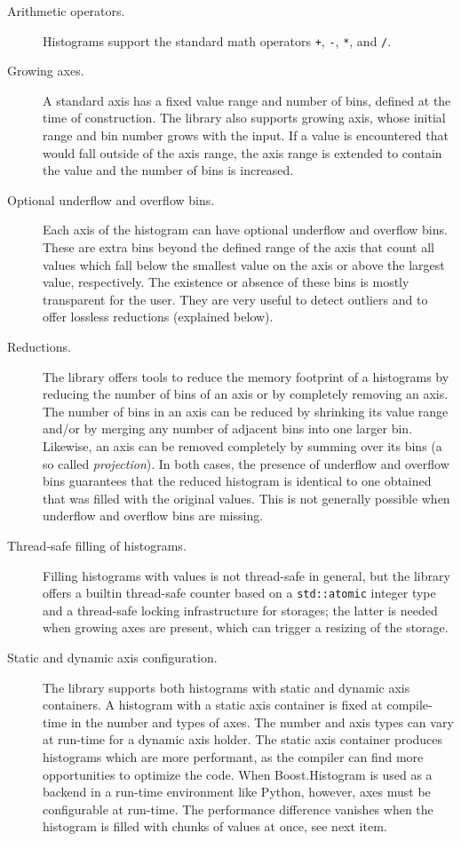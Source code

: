 \documentclass{webofc}
\begin{document}
\begin{description}
\item[Arithmetic operators.] Histograms support the standard math operators \verb|+|, \verb|-|, \verb|*|, and \verb|/|.

\item[Growing axes.] A standard axis has a fixed value range and number of bins, defined at the time of construction. The library also supports growing axis, whose initial range and bin number grows with the input. If a value is encountered that would fall outside of the axis range, the axis range is extended to contain the value and the number of bins is increased.

\item[Optional underflow and overflow bins.] Each axis of the histogram can have optional underflow and overflow bins. These are extra bins beyond the defined range of the axis that count all values which fall below the smallest value on the axis or above the largest value, respectively. The existence or absence of these bins is mostly transparent for the user. They are very useful to detect outliers and to offer lossless reductions (explained below).

\item[Reductions.] The library offers tools to reduce the memory footprint of a histograms by reducing the number of bins of an axis or by completely removing an axis. The number of bins in an axis can be reduced by shrinking its value range and/or by merging any number of adjacent bins into one larger bin. Likewise, an axis can be removed completely by summing over its bins (a so called \emph{projection}). In both cases, the presence of underflow and overflow bins guarantees that the reduced histogram is identical to one obtained that was filled with the original values. This is not generally possible when underflow and overflow bins are missing.

\item[Thread-safe filling of histograms.] Filling histograms with values is not thread-safe in general, but the library offers a builtin thread-safe counter based on a \verb|std::atomic| integer type and a thread-safe locking infrastructure for storages; the latter is needed when growing axes are present, which can trigger a resizing of the storage.

\item[Static and dynamic axis configuration.] The library supports both histograms with static and dynamic axis containers. A histogram with a static axis container is fixed at compile-time in the number and types of axes. The number and axis types can vary at run-time for a dynamic axis holder. The static axis container produces histograms which are more performant, as the compiler can find more opportunities to optimize the code. When Boost.Histogram is used as a backend in a run-time environment like Python, however, axes must be configurable at run-time. The performance difference vanishes when the histogram is filled with chunks of values at once, see next item.


\end{description}
\end{document}

